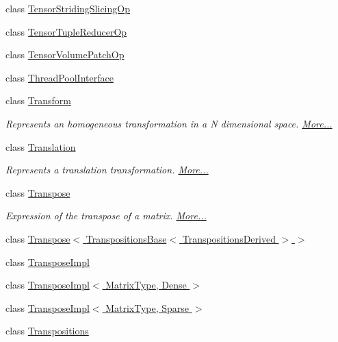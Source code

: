\begin{DoxyCompactItemize}
\item 
class \hyperlink{class_eigen_1_1_tensor_striding_slicing_op}{Tensor\+Striding\+Slicing\+Op}
\item 
class \hyperlink{class_eigen_1_1_tensor_tuple_reducer_op}{Tensor\+Tuple\+Reducer\+Op}
\item 
class \hyperlink{class_eigen_1_1_tensor_volume_patch_op}{Tensor\+Volume\+Patch\+Op}
\item 
class \hyperlink{class_eigen_1_1_thread_pool_interface}{Thread\+Pool\+Interface}
\item 
class \hyperlink{group___geometry___module_class_eigen_1_1_transform}{Transform}
\begin{DoxyCompactList}\small\item\em Represents an homogeneous transformation in a N dimensional space.  \hyperlink{group___geometry___module_class_eigen_1_1_transform}{More...}\end{DoxyCompactList}\item 
class \hyperlink{group___geometry___module_class_eigen_1_1_translation}{Translation}
\begin{DoxyCompactList}\small\item\em Represents a translation transformation.  \hyperlink{group___geometry___module_class_eigen_1_1_translation}{More...}\end{DoxyCompactList}\item 
class \hyperlink{group___core___module_class_eigen_1_1_transpose}{Transpose}
\begin{DoxyCompactList}\small\item\em Expression of the transpose of a matrix.  \hyperlink{group___core___module_class_eigen_1_1_transpose}{More...}\end{DoxyCompactList}\item 
class \hyperlink{class_eigen_1_1_transpose_3_01_transpositions_base_3_01_transpositions_derived_01_4_01_4}{Transpose$<$ Transpositions\+Base$<$ Transpositions\+Derived $>$ $>$}
\item 
class \hyperlink{class_eigen_1_1_transpose_impl}{Transpose\+Impl}
\item 
class \hyperlink{class_eigen_1_1_transpose_impl_3_01_matrix_type_00_01_dense_01_4}{Transpose\+Impl$<$ Matrix\+Type, Dense $>$}
\item 
class \hyperlink{class_eigen_1_1_transpose_impl_3_01_matrix_type_00_01_sparse_01_4}{Transpose\+Impl$<$ Matrix\+Type, Sparse $>$}
\item 
class \hyperlink{group___core___module_class_eigen_1_1_transpositions}{Transpositions}

\end{DoxyCompactItemize}
